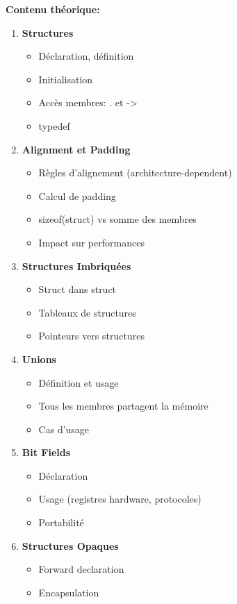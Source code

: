 \documentclass[10pt,a4paper]{article}
\begin{document}
\textbf{Contenu théorique:}
\begin{enumerate}
\item \textbf{Structures}
   \begin{itemize}
   \item Déclaration, définition
   \item Initialisation
   \item Accès membres: . et ->
   \item typedef
   \end{itemize}

\item \textbf{Alignment et Padding}
   \begin{itemize}
   \item Règles d'alignement (architecture-dependent)
   \item Calcul de padding
   \item sizeof(struct) vs somme des membres
   \item Impact sur performances
   \end{itemize}

\item \textbf{Structures Imbriquées}
   \begin{itemize}
   \item Struct dans struct
   \item Tableaux de structures
   \item Pointeurs vers structures
   \end{itemize}

\item \textbf{Unions}
   \begin{itemize}
   \item Définition et usage
   \item Tous les membres partagent la mémoire
   \item Cas d'usage
   \end{itemize}

\item \textbf{Bit Fields}
   \begin{itemize}
   \item Déclaration
   \item Usage (registres hardware, protocoles)
   \item Portabilité
   \end{itemize}

\item \textbf{Structures Opaques}
   \begin{itemize}
   \item Forward declaration
   \item Encapsulation
   \end{itemize}
\end{enumerate}
\end{document}
